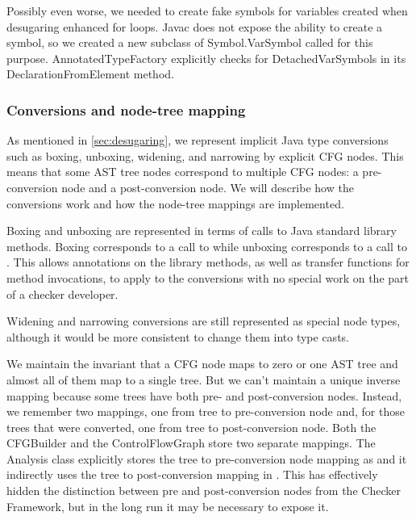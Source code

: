 Possibly even worse, we needed to create fake symbols for variables created when
desugaring enhanced for loops.  Javac does not expose the ability to create a symbol,
so we created a new subclass of Symbol.VarSymbol called  for this purpose.  AnnotatedTypeFactory
explicitly checks for DetachedVarSymbols in its DeclarationFromElement method.



\subsubsection{Conversions and node-tree mapping}
\label{sec:conversions}

As mentioned in \autoref{sec:desugaring}, we represent implicit Java type conversions such as boxing, unboxing, widening, and narrowing by explicit CFG nodes.  This means that some 
AST tree nodes correspond to multiple CFG nodes: a pre-conversion node and a post-conversion
node.  We will describe how the conversions work and how the node-tree mappings are
implemented.

Boxing and unboxing are represented in terms of calls to Java standard library methods.  Boxing
corresponds to a call to  while unboxing corresponds to a call to
.  This allows annotations on the library methods, as well as transfer functions for method invocations, to apply to the conversions with no special work on the part of
a checker developer.

Widening and narrowing conversions are still represented as special node types, although
it would be more consistent to change them into type casts.

We maintain the invariant that a CFG node maps to zero or one AST tree and almost all of them map to a single tree.  But we can't maintain a unique inverse mapping because some trees have both pre- and post-conversion nodes.  Instead, we remember two mappings, one from tree to pre-conversion node and, for those trees that were converted, one from tree to post-conversion node.  Both the CFGBuilder and the ControlFlowGraph store two separate mappings.  The Analysis class explicitly stores the tree to pre-conversion node mapping as  and it indirectly uses the tree to post-conversion mapping in .  This has effectively hidden the distinction between pre and post-conversion nodes from the Checker Framework, but in the long run
it may be necessary to expose it.



